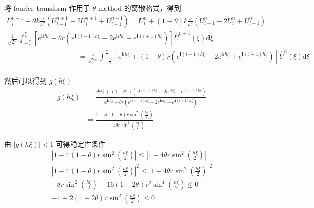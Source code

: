 \documentclass[a4paper]{article}
\begin{document}
\par 将 fourier transform 作用于 $\theta$-method 的离散格式，得到
\begin{equation}
    \begin{gathered}
        U_{i}^{n+1} - \theta k\frac{\nu}{h^2}
        \left(
            U_{i-1}^{n+1}-2U_{i}^{n+1}+U_{i+1}^{n+1}
        \right)
        = U_{i}^{n} + (1-\theta) k\frac{\nu}{h^2}
        \left(
            U_{i-1}^{n}-2U_{i}^{n}+U_{i+1}^{n}
        \right)\\
        \frac{1}{\sqrt{2\pi}}
        \int_{-\frac{\pi}{h}}^{\frac{\pi}{h}}
        \left[
            e^{\mathbf{i}ih\xi}
            - \theta r
            \left(
                e^{\mathbf{i}(i-1)h\xi}-2e^{\mathbf{i}ih\xi}+e^{\mathbf{i}(i+1)h\xi}
            \right)
        \right]
        \hat{U}^{n+1}(\xi)\text{d}\xi\qquad\qquad\qquad\qquad\qquad\\
        \qquad\qquad\qquad\qquad\qquad=\frac{1}{\sqrt{2\pi}}
        \int_{-\frac{\pi}{h}}^{\frac{\pi}{h}}
        \left[
            e^{\mathbf{i}ih\xi}
            + (1-\theta) r
            \left(
                e^{\mathbf{i}(i-1)h\xi}-2e^{\mathbf{i}ih\xi}+e^{\mathbf{i}(i+1)h\xi}
            \right)
        \right]
        \hat{U}^{n}(\xi)\text{d}\xi\\
    \end{gathered}
\end{equation}
\par 然后可以得到 $g(h\xi)$
\begin{equation}
    \begin{aligned}
        g(h\xi)&=\frac{e^{\mathbf{i}ih\xi} + (1-\theta) r \left(e^{\mathbf{i}(i-1)h\xi} - 2e^{\mathbf{i}ih\xi} + e^{\mathbf{i}(i+1)h\xi}\right)}{e^{\mathbf{i}ih\xi} - \theta r \left(e^{\mathbf{i}(i-1)h\xi} - 2e^{\mathbf{i}ih\xi} + e^{\mathbf{i}(i+1)h\xi}\right)}\\
        &=\frac{1 - 4(1-\theta)r\sin^2\left(\frac{h\xi}{2}\right)}{1 + 4\theta r\sin^2\left(\frac{h\xi}{2}\right)}
    \end{aligned}
\end{equation}
\par 由 $\left|g(h\xi)\right|<1$ 可得稳定性条件
\begin{equation}
    \begin{gathered}
        \left|1 - 4(1-\theta)r\sin^2\left(\frac{h\xi}{2}\right)\right|
        \leq \left|1 + 4\theta r\sin^2\left(\frac{h\xi}{2}\right)\right|\\
        \left|1 - 4(1-\theta)r\sin^2\left(\frac{h\xi}{2}\right)\right|^2
        \leq \left|1 + 4\theta r\sin^2\left(\frac{h\xi}{2}\right)\right|^2\\
        -8r\sin^2\left(\frac{h\xi}{2}\right) + 16(1-2\theta)r^2\sin^4\left(\frac{h\xi}{2}\right)
        \leq 0\\
        -1 + 2(1-2\theta)r\sin^2\left(\frac{h\xi}{2}\right)
        \leq 0\\
    \end{gathered}
\end{equation}
\end{document}
